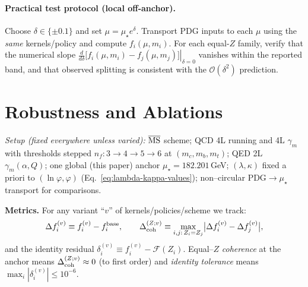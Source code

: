 \documentclass[epjc3]{svjour3}
\begin{document}
\paragraph{Practical test protocol (local off-anchor).}
Choose $\delta\in\{\pm 0.1\}$ and set $\mu=\mu_\star e^{\delta}$. Transport PDG inputs to each $\mu$ using the \emph{same} kernels/policy and compute $f_i(\mu,m_i)$. For each equal-$Z$ family, verify that the numerical slope
\(
\left.\tfrac{d}{d\delta}\bigl[f_i(\mu,m_i)-f_j(\mu,m_j)\bigr]\right|_{\delta=0}
\)
vanishes within the reported band, and that observed splitting is consistent with the $\mathcal O(\delta^2)$ prediction.


\section{Robustness and Ablations}\label{sec:robustness}

\noindent\emph{Setup (fixed everywhere unless varied):} $\overline{\rm MS}$ scheme; QCD 4L running and 4L $\gamma_m$ with thresholds stepped $n_f:3\!\to\!4\!\to\!5\!\to\!6$ at $(m_c,m_b,m_t)$; QED 2L $\gamma_m(\alpha,Q)$; one global (this paper) anchor $\mu_\star=182.201\,$GeV; $(\lambda,\kappa)$ fixed a priori to $(\ln\varphi,\varphi)$ (Eq.~\eqref{eq:lambda-kappa-values}); non–circular PDG$\to\mu_\star$ transport for comparisons.%

\vspace{0.35em}
\noindent\textbf{Metrics.} For any variant ``$v$'' of kernels/policies/scheme we track:
\[
\Delta f_i^{(v)} \equiv f_i^{(v)}-f_i^{\rm base},\qquad
\Delta_{\rm coh}^{(Z;v)} \equiv \max_{i,j:\,Z_i=Z_j}\bigl|\Delta f_i^{(v)}-\Delta f_j^{(v)}\bigr|,
\]
and the identity residual
\(
\delta_i^{(v)} \equiv f_i^{(v)}-\mathcal F(Z_i).
\)
Equal–$Z$ \emph{coherence} at the anchor means $\Delta_{\rm coh}^{(Z;v)}\approx 0$ (to first order) and \emph{identity tolerance} means $\max_i|\delta_i^{(v)}|\le 10^{-6}$.
\end{document}
